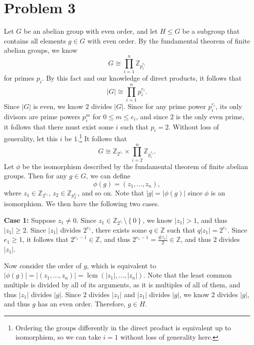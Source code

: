 \documentclass[11pt, letterpaper]{report}
\begin{document}
\section*{Problem 3}
\begin{solution}
	Let $G$ be an abelian group with even order, and let $H\leq G$ be a subgroup that contains all elements $g\in G$ with even order. By the fundamental theorem of finite abelian groups, we know
	\[
		G\cong \prod_{i=1}^{n} \mathbb{Z}_{p_i^{e_i}} 
	\]
	for primes $p_i$. By this fact and our knowledge of direct products, it follows that
	\[
		\left| G \right| \cong \prod_{i=1}^{n} p_i^{e_i} 
	.\]
	Since $\left| G \right| $ is even, we know $2$ divides $ \left| G \right| $. Since for any prime power $p_i^{e_i}$, its only divisors are prime powers $p_i^{m}$ for $0\leq m\leq e_i$, and since $2$ is the only even prime, it follows that there must exist some $i$ such that $p_i=2$. Without loss of generality, let this $i$ be $1$.\footnote{Ordering the groups differently in the direct product is equivalent up to isomorphism, so we can take $i=1$ without loss of generality here.} It follows that
	\[
		G\cong \mathbb{Z}_{2^{e_1}}\times \prod_{i=2}^{n} \mathbb{Z}_{p_i^{e_i}}
	.\]
	Let $\phi $ be the isomorphism described by the fundamental theorem of finite abelian groups. Then for any $g\in G$, we can define
	\[
		\phi (g)=\left( z_1, \dots, z_n  \right) ,
	\]
where $z_1\in\mathbb{Z}_{2^{e_1}}$, $z_2\in\mathbb{Z}_{p_2^{e_e}}$, and so on. Note that $\left| g \right| =\left| \phi (g) \right| $ since $\phi $ is an isomorphism. We then have the following two cases.

\textbf{Case 1:} Suppose $z_1\neq 0$. Since $z_1\in\mathbb{Z}_{2^{e_1}}\setminus\left\{ 0 \right\} $, we know $\left| z_1 \right| >1$, and thus $\left| z_1 \right| \geq 2 $. Since $\left| z_1 \right| $ divides $ 2^{e_1}$, there exists some $q\in\mathbb{Z}$ such that $q\left| z_1 \right| =2^{e_1}$. Since $e_1\geq 1$, it follows that $2^{e_1-1}\in\mathbb{Z}$, and thus $2^{e_1-1}=\frac{q|z_1|}{2}\in\mathbb{Z}$, and thus $2$ divides $ \left| z_1 \right| $.

Now consider the order of $g$, which is equivalent to $\left| \phi (g) \right|= \left| \left( z_1, \dots, z_n  \right)  \right| =\operatorname{lcm}(\left| z_1 \right| ,\ldots,\left| z_n \right| ) $. Note that the least common multiple is divided by all of its arguments, as it is multiples of all of them, and thus $\left| z_1 \right| $ divides $\left| g \right|  $. Since $2$ divides $\left| z_1 \right| $ and $\left| z_1 \right| $ divides $\left| g \right| $, we know $2$ divides $\left| g \right| $, and thus $g$ has an even order. Therefore, $g\in H$.


\end{solution}
\end{document}
